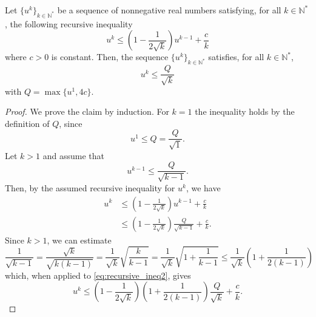 \begin{toappendix}
\begin{lemma}\label{lem:recursivevanishing}   
    Let $\{u^k\}_{k\in\mathbb{N}^*}$ be a sequence of nonnegative real numbers satisfying, for all $k\in\mathbb{N}^*$, the following recursive inequality
    \begin{equation*}
        u^k\leq \left(1-\frac{1}{2\sqrt{k}}\right)u^{k-1} + \frac{c}{k}
    \end{equation*}
    where $c>0$ is constant.
    Then, the sequence $\{u^k\}_{k\in\mathbb{N}^*}$ satisfies, for all $k\in\mathbb{N}^*$,
    \begin{equation*}
        u^k \leq \frac{Q}{\sqrt{k}}
    \end{equation*}
    with $Q=\max\{u^1, 4c\}$.
\end{lemma}
\begin{proof}
    We prove the claim by induction. For $k=1$ the inequality holds by the definition of $Q$, since
    \begin{equation*}
        u^1 \leq Q = \frac{Q}{\sqrt{1}}.
    \end{equation*}
    Let $k>1$ and assume that
    \begin{equation*}
        u^{k-1}\leq\frac{Q}{\sqrt{k-1}}.
    \end{equation*}
    Then, by the assumed recursive inequality for $u^k$, we have
    \begin{equation}\label{eq:recursive_ineq2}
        \begin{aligned}
            u^{k}
                &\leq \left(1-\frac{1}{2\sqrt{k}}\right)u^{k-1} + \frac{c}{k}\\
                &\leq \left(1-\frac{1}{2\sqrt{k}}\right)\frac{Q}{\sqrt{k-1}} + \frac{c}{k}.
        \end{aligned}
    \end{equation}
    Since $k>1$, we can estimate
    \begin{equation*}
        \frac{1}{\sqrt{k-1}} = \frac{\sqrt{k}}{\sqrt{k(k-1)}} = \frac{1}{\sqrt{k}}\sqrt{\frac{k}{k-1}} = \frac{1}{\sqrt{k}}\sqrt{1 + \frac{1}{k-1}} \leq \frac{1}{\sqrt{k}}\left(1 + \frac{1}{2(k-1)}\right)
    \end{equation*}
    which, when applied to \eqref{eq:recursive_ineq2}, gives
    \begin{equation}\label{eq:recursive_ineq3}
        u^k\leq \left(1-\frac{1}{2\sqrt{k}}\right)\left(1+\frac{1}{2(k-1)}\right)\frac{Q}{\sqrt{k}} + \frac{c}{k}.
    \end{equation}

\end{proof}
\end{toappendix}
